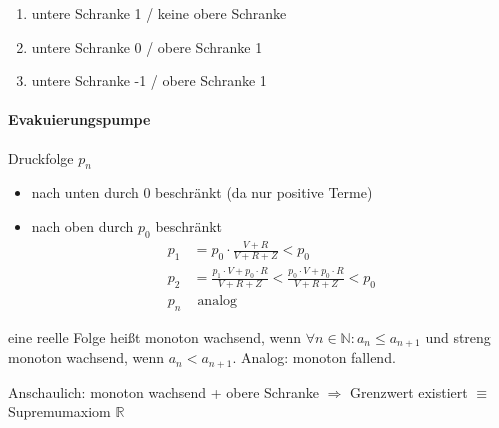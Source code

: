 \begin{example}
\begin{enumerate}
	\item untere Schranke 1 / keine obere Schranke
	\item untere Schranke 0 / obere Schranke 1
	\item untere Schranke -1 / obere Schranke 1
\end{enumerate}
\end{example}

\paragraph{Evakuierungspumpe}
Druckfolge $p_n$
\begin{itemize}
\item nach unten durch 0 beschränkt (da nur positive Terme)
\item nach oben durch $p_0$ beschränkt
\begin{align*}
p_1 &= p_0 \cdot \frac{V + R}{V + R + Z} < p_0 \\
p_2 &= \frac{p_1 \cdot V + p_0 \cdot R}{V + R + Z} < \frac{p_0 \cdot V + p_0 \cdot R}{V + R + Z} < p_0 \\
p_n &\text{ analog}
\end{align*}
\end{itemize}

\begin{definition}
eine reelle Folge heißt monoton wachsend, wenn $\forall n \in \mathbb N : a_n \le a_{n+1}$ und
streng monoton wachsend, wenn $a_n < a_{n+1}$. Analog: monoton fallend.
\end{definition}
Anschaulich: monoton wachsend + obere Schranke $\Rightarrow$ Grenzwert existiert $\equiv$ Supremumaxiom $\mathbb R$

